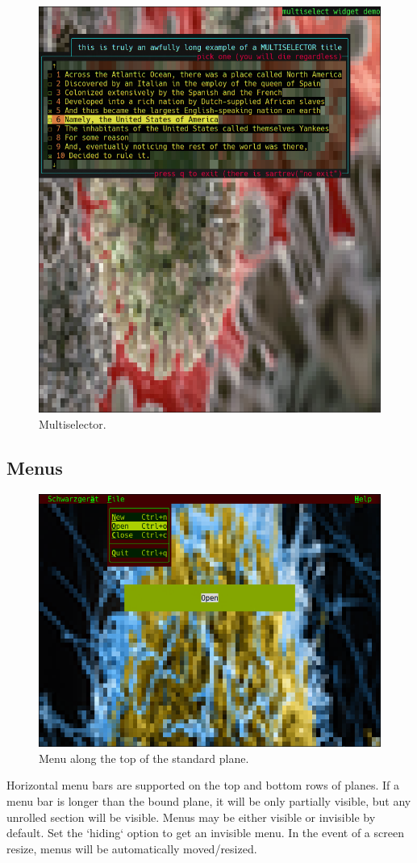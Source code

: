 \documentclass[letterpaper,10pt]{article}
\begin{document}
\begin{figure}
    \centering
    \includegraphics[width=1\linewidth]{media/multiselector.png}
    \caption{Multiselector.}
\end{figure}

\subsection{Menus}
\label{sec:menus}
\begin{figure}
    \centering
    \includegraphics[width=.75\linewidth]{media/menutop.png}
    \caption{Menu along the top of the standard plane.}
\end{figure}
Horizontal menu bars are supported on the top and bottom rows of planes. If a
menu bar is longer than the bound plane, it will be only partially visible, but
any unrolled section will be visible. Menus may be either visible or invisible
by default. Set the `hiding` option to get an invisible menu. In the event of a
screen resize, menus will be automatically moved/resized.
\end{document}
